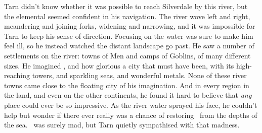 Tarn didn't know whether it was possible to reach Silverdale by this river, but the elemental seemed confident in his navigation.  The river wove left and right, meandering and joining forks, widening and narrowing, and it was impossible for Tarn to keep his sense of direction. Focusing on the water was sure to make him feel ill, so he instead watched the distant landscape go past.  He saw a number of settlements on the river: towns of Men and camps of Goblins, of many different sizes.  He imagined \valdunmir, and how glorious a city that must have been, with its high-reaching towers, and sparkling seas, and wonderful metals.  None of these river towns came close to the floating city of his imagination.  And in every region in the land, and even on the other continents, he found it hard to believe that \emph{any} place could ever be so impressive.  As the river water sprayed his face, he couldn't help but wonder if there ever really was a chance of restoring \valdunmir\ from the depths of the sea.  \mothzam\ was surely mad, but Tarn quietly sympathised  with that madness.





















